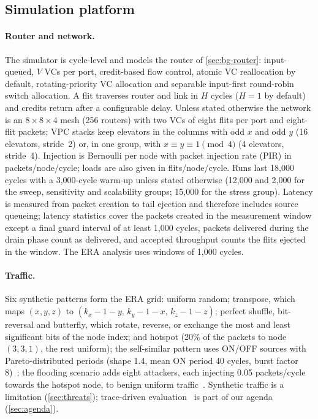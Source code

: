 \subsection{Simulation platform}
\label{sec:platform}

\paragraph{Router and network.} The simulator is cycle-level and models the router of \cref{sec:bg-router}: input-queued, $V$ VCs per port, credit-based flow control, atomic VC reallocation by default, rotating-priority VC allocation and separable input-first round-robin switch allocation. A flit traverses router and link in $H$ cycles ($H=1$ by default) and credits return after a configurable delay. Unless stated otherwise the network is an $8\times8\times4$ mesh (256 routers) with two VCs of eight flits per port and eight-flit packets; VPC stacks keep elevators in the columns with odd $x$ and odd $y$ (16 elevators, stride~2) or, in one group, with $x\equiv y\equiv1 \pmod 4$ (4 elevators, stride~4). Injection is Bernoulli per node with packet injection rate (PIR) in packets/node/cycle; loads are also given in flits/node/cycle. Runs last 18,000 cycles with a 3,000-cycle warm-up unless stated otherwise (12,000 and 2,000 for the sweep, sensitivity and scalability groups; 15,000 for the stress group). Latency is measured from packet creation to tail ejection and therefore includes source queueing; latency statistics cover the packets created in the measurement window except a final guard interval of at least 1,000 cycles, packets delivered during the drain phase count as delivered, and accepted throughput counts the flits ejected in the window. The ERA analysis uses windows of 1,000 cycles.

\paragraph{Traffic.} Six synthetic patterns form the ERA grid: uniform random; transpose, which maps $(x,y,z)$ to $(k_x-1-y,\,k_y-1-x,\,k_z-1-z)$; perfect shuffle, bit-reversal and butterfly, which rotate, reverse, or exchange the most and least significant bits of the node index; and hotspot (20\% of the packets to node $(3,3,1)$, the rest uniform); the self-similar pattern uses ON/OFF sources with Pareto-distributed periods (shape 1.4, mean ON period 40 cycles, burst factor 8)~\cite{willinger1997selfsim}; the flooding scenario adds eight attackers, each injecting 0.05 packets/cycle towards the hotspot node, to benign uniform traffic~\cite{charles2021security}. Synthetic traffic is a limitation (\cref{sec:threats}); trace-driven evaluation~\cite{hestness2010netrace} is part of our agenda (\cref{sec:agenda}).

